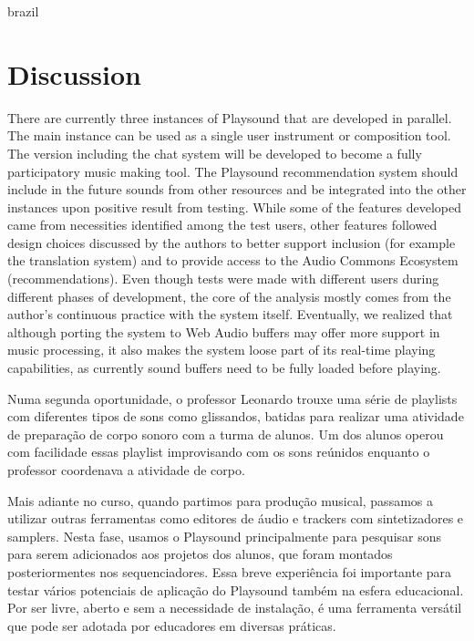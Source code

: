\begin{otherlanguage*}{brazil}
\section{Discussion}

There are currently three instances of Playsound that are developed in parallel. The main instance can be used as a single user instrument or composition tool. The version including the chat system will be developed to become a fully participatory music making tool. The Playsound recommendation system should include in the future sounds from other resources and be integrated into the other instances upon positive result from testing. While some of the features developed came from necessities identified among the test users, other features followed design choices discussed by the authors to better support inclusion (for example the translation system) and to provide access to the Audio Commons Ecosystem (recommendations). Even though tests were made with different users during different phases of development, the core of the analysis mostly comes from the author's continuous practice with the system itself. Eventually, we realized that although porting the system to Web Audio buffers may offer more support in music processing, it also makes the system loose part of its real-time playing capabilities, as currently sound buffers need to be fully loaded before playing.




Numa segunda oportunidade, o professor Leonardo trouxe uma série de playlists com diferentes tipos de sons como glissandos, batidas para realizar uma atividade de preparação de corpo sonoro com a turma de alunos. Um dos alunos operou com facilidade essas playlist improvisando com os sons reúnidos enquanto o professor coordenava a atividade de corpo. 

Mais adiante no curso, quando partimos para produção musical, passamos a utilizar outras ferramentas como editores de áudio e trackers com sintetizadores e samplers. Nesta fase, usamos o Playsound principalmente para pesquisar sons para serem adicionados aos projetos dos alunos, que foram montados posteriormentes nos sequenciadores. Essa breve experiência foi importante para testar vários potenciais de aplicação do Playsound também na esfera educacional. Por ser livre, aberto e sem a necessidade de instalação, é uma ferramenta versátil que pode ser adotada por educadores em diversas práticas.



\end{otherlanguage*}
